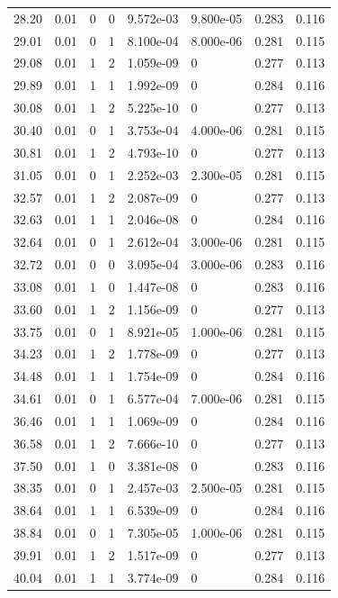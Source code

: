 \documentclass[preview]{standalone}
\begin{document}
{{{\begin{tabular}{L{1.2cm}C{1.2cm} C{0.3cm}C{0.5cm} C{1.4cm}C{1.4cm} C{1.4cm}C{1.4cm}}
  28.20  &  0.01  & 0     &  0 &  9.572e-03  & 9.800e-05  & 0.283 &  0.116   \\ 
  29.01  &  0.01  & 0     &  1 &  8.100e-04  & 8.000e-06  & 0.281 &  0.115   \\ 
  29.08  &  0.01  & 1     &  2 &  1.059e-09  & 0  & 0.277 &  0.113   \\ 
  29.89  &  0.01  & 1     &  1 &  1.992e-09  & 0  & 0.284 &  0.116   \\ 
  30.08  &  0.01  & 1     &  2 &  5.225e-10  & 0  & 0.277 &  0.113   \\ 
  30.40  &  0.01  & 0     &  1 &  3.753e-04  & 4.000e-06  & 0.281 &  0.115   \\ 
  30.81  &  0.01  & 1     &  2 &  4.793e-10  & 0  & 0.277 &  0.113   \\ 
  31.05  &  0.01  & 0     &  1 &  2.252e-03  & 2.300e-05  & 0.281 &  0.115   \\ 
  32.57  &  0.01  & 1     &  2 &  2.087e-09  & 0  & 0.277 &  0.113   \\ 
  32.63  &  0.01  & 1     &  1 &  2.046e-08  & 0  & 0.284 &  0.116   \\ 
  32.64  &  0.01  & 0     &  1 &  2.612e-04  & 3.000e-06  & 0.281 &  0.115   \\ 
  32.72  &  0.01  & 0     &  0 &  3.095e-04  & 3.000e-06  & 0.283 &  0.116   \\ 
  33.08  &  0.01  & 1     &  0 &  1.447e-08  & 0  & 0.283 &  0.116   \\ 
  33.60  &  0.01  & 1     &  2 &  1.156e-09  & 0  & 0.277 &  0.113   \\ 
  33.75  &  0.01  & 0     &  1 &  8.921e-05  & 1.000e-06  & 0.281 &  0.115   \\ 
  34.23  &  0.01  & 1     &  2 &  1.778e-09  & 0  & 0.277 &  0.113   \\ 
  34.48  &  0.01  & 1     &  1 &  1.754e-09  & 0  & 0.284 &  0.116   \\ 
  34.61  &  0.01  & 0     &  1 &  6.577e-04  & 7.000e-06  & 0.281 &  0.115   \\ 
  36.46  &  0.01  & 1     &  1 &  1.069e-09  & 0  & 0.284 &  0.116   \\ 
  36.58  &  0.01  & 1     &  2 &  7.666e-10  & 0  & 0.277 &  0.113   \\ 
  37.50  &  0.01  & 1     &  0 &  3.381e-08  & 0  & 0.283 &  0.116   \\ 
  38.35  &  0.01  & 0     &  1 &  2.457e-03  & 2.500e-05  & 0.281 &  0.115   \\ 
  38.64  &  0.01  & 1     &  1 &  6.539e-09  & 0  & 0.284 &  0.116   \\ 
  38.84  &  0.01  & 0     &  1 &  7.305e-05  & 1.000e-06  & 0.281 &  0.115   \\ 
  39.91  &  0.01  & 1     &  2 &  1.517e-09  & 0  & 0.277 &  0.113   \\ 
  40.04  &  0.01  & 1     &  1 &  3.774e-09  & 0  & 0.284 &  0.116   \\ 
\hline 
\end{tabular} 

}}}
\end{document}
